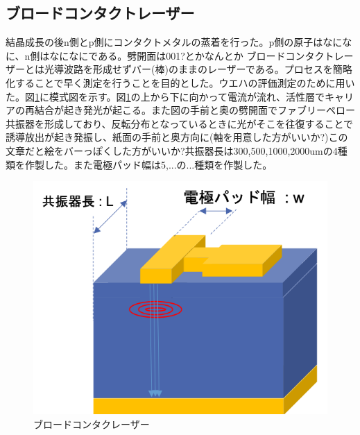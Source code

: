 \subsection{ブロードコンタクトレーザー}%
結晶成長の後n側とp側にコンタクトメタルの蒸着を行った。p側の原子はなになに、n側はなになにである。劈開面は001?とかなんとか
ブロードコンタクトレーザーとは光導波路を形成せずバー(棒)のままのレーザーである。プロセスを簡略化することで早く測定を行うことを目的とした。ウエハの評価測定のために用いた。図\ref{fig:sample_broadcontact}に模式図を示す。図\ref{fig:sample_broadcontact}の上から下に向かって電流が流れ、活性層でキャリアの再結合が起き発光が起こる。また図の手前と奥の劈開面でファブリーペロー共振器を形成しており、反転分布となっているときに光がそこを往復することで誘導放出が起き発振し、紙面の手前と奥方向に(軸を用意した方がいいか?)この文章だと絵をバーっぽくした方がいいか?共振器長は300,500,1000,2000umの4種類を作製した。また電極パッド幅は5,...の...種類を作製した。

\begin{figure}[htbp]
	\includegraphics[width=15cm]{figure/fig_broadcontact.png}
	\caption{ブロードコンタクレーザー}
	\label{fig:sample_broadcontact}
\end{figure}


